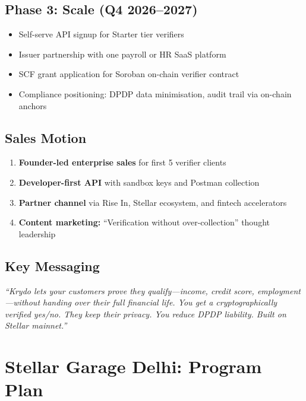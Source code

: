 \documentclass[11pt,a4paper]{article}
\newcommand{\krydo}{\textsf{Krydo}}
\newcommand{\stellar}{\textsf{Stellar}}
\newcommand{\soroban}{\textsf{Soroban}}
\begin{document}
\subsection{Phase 3: Scale (Q4 2026--2027)}

\begin{itemize}
  \item Self-serve API signup for Starter tier verifiers
  \item Issuer partnership with one payroll or HR SaaS platform
  \item SCF grant application for \soroban{} on-chain verifier contract
  \item Compliance positioning: DPDP data minimisation, audit trail via on-chain anchors
\end{itemize}

\subsection{Sales Motion}

\begin{enumerate}
  \item \textbf{Founder-led enterprise sales} for first 5 verifier clients
  \item \textbf{Developer-first API} with sandbox keys and Postman collection
  \item \textbf{Partner channel} via Rise In, \stellar{} ecosystem, and fintech accelerators
  \item \textbf{Content marketing:} ``Verification without over-collection'' thought leadership
\end{enumerate}

\subsection{Key Messaging}

\begin{keybox}
  \textit{``\krydo{} lets your customers prove they qualify---income, credit score, employment---without handing over their full financial life. You get a cryptographically verified yes/no. They keep their privacy. You reduce DPDP liability. Built on \stellar{} mainnet.''}
\end{keybox}

\section{Stellar Garage Delhi: Program Plan}
\end{document}
